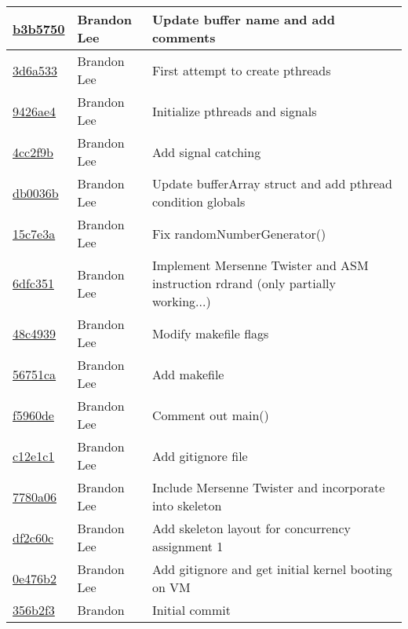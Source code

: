 \documentclass[letterpaper,10pt,titlepage]{article}
\begin{document}
\begin{tabular}{l l l}
\href{https://github.com/brandonlee503/Operating-Systems-II/commit/b3b5750260bd9cf8adabcd0ca24855adf7d50079}{b3b5750} & Brandon Lee & Update buffer name and add comments\\\hline
\href{https://github.com/brandonlee503/Operating-Systems-II/commit/3d6a533c046f97cbb0a0ac6d3840920dcdd8fd34}{3d6a533} & Brandon Lee & First attempt to create pthreads\\\hline
\href{https://github.com/brandonlee503/Operating-Systems-II/commit/9426ae4f28223c8b994fd214f9e298d52814835c}{9426ae4} & Brandon Lee & Initialize pthreads and signals\\\hline
\href{https://github.com/brandonlee503/Operating-Systems-II/commit/4cc2f9b2ed449d28f2389898439c225e8c0ef1d2}{4cc2f9b} & Brandon Lee & Add signal catching\\\hline
\href{https://github.com/brandonlee503/Operating-Systems-II/commit/db0036bf79ff6d521b27752690d93d5755b7f2db}{db0036b} & Brandon Lee & Update bufferArray struct and add pthread condition globals\\\hline
\href{https://github.com/brandonlee503/Operating-Systems-II/commit/15c7e3a328350275d16b434e1c0f595a5a5fd233}{15c7e3a} & Brandon Lee & Fix randomNumberGenerator()\\\hline
\href{https://github.com/brandonlee503/Operating-Systems-II/commit/6dfc3514d54aec67a649104be41f24df73757773}{6dfc351} & Brandon Lee & Implement Mersenne Twister and ASM instruction rdrand (only partially working...)\\\hline
\href{https://github.com/brandonlee503/Operating-Systems-II/commit/48c4939fc457964828f7b020f8d98003fc335198}{48c4939} & Brandon Lee & Modify makefile flags\\\hline
\href{https://github.com/brandonlee503/Operating-Systems-II/commit/56751ca219659e22cff314ce3ebcfda20eed6c52}{56751ca} & Brandon Lee & Add makefile\\\hline
\href{https://github.com/brandonlee503/Operating-Systems-II/commit/f5960de6e29c1a85019166197e2a635a8ba9b48f}{f5960de} & Brandon Lee & Comment out main()\\\hline
\href{https://github.com/brandonlee503/Operating-Systems-II/commit/c12e1c1d30721ebe1788a68afa10db46a1f6c9e5}{c12e1c1} & Brandon Lee & Add gitignore file\\\hline
\href{https://github.com/brandonlee503/Operating-Systems-II/commit/7780a0661dae0ce564caff4a6e3ca395a8f64273}{7780a06} & Brandon Lee & Include Mersenne Twister and incorporate into skeleton\\\hline
\href{https://github.com/brandonlee503/Operating-Systems-II/commit/df2c60cc37e1058400e7eb60042fb6f5728dbc5c}{df2c60c} & Brandon Lee & Add skeleton layout for concurrency assignment 1\\\hline
\href{https://github.com/brandonlee503/Operating-Systems-II/commit/0e476b2d4030e0350550a8cbda451926434605e9}{0e476b2} & Brandon Lee & Add gitignore and get initial kernel booting on VM\\\hline
\href{https://github.com/brandonlee503/Operating-Systems-II/commit/356b2f317a8ab32834e730b9fdfaa7344dec44ed}{356b2f3} & Brandon & Initial commit\\\hline
\end{tabular}
\end{document}
